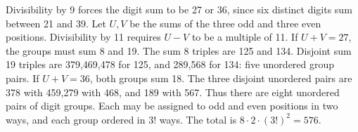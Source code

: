 Divisibility by 9 forces the digit sum to be 27 or 36, since six distinct digits sum between 21 and 39. Let $U,V$ be the sums of the three odd and three even positions. Divisibility by 11 requires $U-V$ to be a multiple of 11. If $U+V=27$, the groups must sum 8 and 19. The sum 8 triples are 125 and 134. Disjoint sum 19 triples are 379,469,478 for 125, and 289,568 for 134: five unordered group pairs. If $U+V=36$, both groups sum 18. The three disjoint unordered pairs are 378 with 459,279 with 468, and 189 with 567. Thus there are eight unordered pairs of digit groups. Each may be assigned to odd and even positions in two ways, and each group ordered in $3!$ ways. The total is $8\cdot2\cdot(3!)^2=\boxed{576}$.
